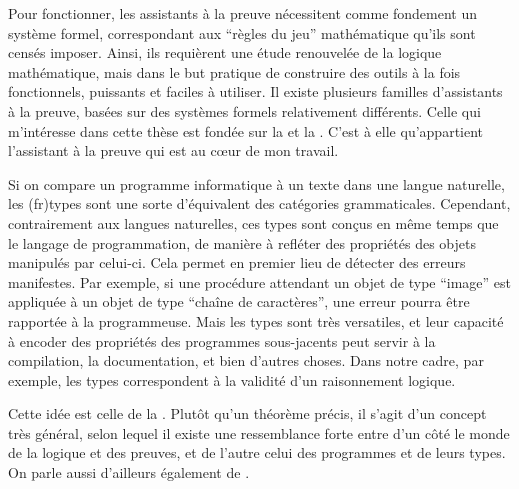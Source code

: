 Pour fonctionner, les assistants à la preuve nécessitent comme fondement un système
formel, correspondant aux “règles du jeu” mathématique qu’ils sont censés imposer.
Ainsi, ils requièrent une étude renouvelée de la logique mathématique, mais dans le but
pratique de construire des outils à la fois fonctionnels,
puissants et faciles à utiliser.
Il existe plusieurs familles d’assistants à la preuve, basées sur des
systèmes formels relativement différents. Celle qui m’intéresse dans cette thèse
est fondée sur la 
et la .
C’est à elle qu’appartient l’assistant à la preuve 
 qui est au cœur de mon travail.

Si on compare un programme informatique à un texte dans une langue naturelle,
les \intro(fr){types} sont une sorte d’équivalent des catégories grammaticales.
Cependant, contrairement aux langues naturelles, ces types sont conçus
en même temps que le langage de programmation,
de manière à refléter des propriétés des objets manipulés par celui-ci.
Cela permet en premier lieu de détecter des erreurs manifestes.
Par exemple, si une procédure attendant un objet de type “image” est
appliquée à un objet de type “chaîne de caractères”, une erreur pourra être rapportée
à la programmeuse.%
Mais les types sont très versatiles, et leur capacité à encoder
des propriétés des programmes sous-jacents peut servir à la compilation, la
documentation, et bien d’autres choses.
Dans notre cadre, par exemple, les types correspondent à la validité d’un raisonnement logique.

Cette idée est celle de la .%
%
%
Plutôt qu’un théorème précis, il s’agit d’un concept très général,
selon lequel il existe une ressemblance forte entre d’un côté le monde de la
logique et des preuves, et de l’autre celui des programmes et de leurs types.
On parle aussi d’ailleurs également de .

